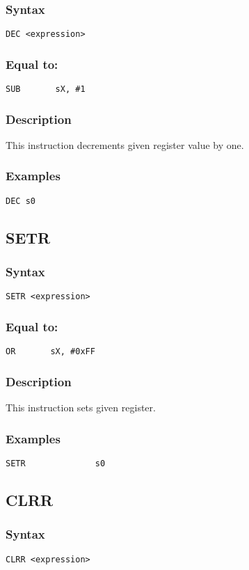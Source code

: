         \subsubsection{Syntax}
            \verb'DEC <expression>'

        \subsubsection{Equal to:}
            \verb'SUB       sX, #1'

        \subsubsection{Description}
            This instruction decrements given register value by one.

        \subsubsection{Examples}
            \verb'DEC s0'

    \subsection{SETR}
        \subsubsection{Syntax}
            \verb'SETR <expression>'

        \subsubsection{Equal to:}
            \verb'OR       sX, #0xFF'

        \subsubsection{Description}
            This instruction sets given register.

        \subsubsection{Examples}
            \verb'SETR              s0'

    \subsection{CLRR}
        \subsubsection{Syntax}
            \verb'CLRR <expression>'

